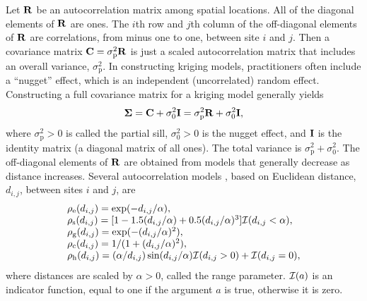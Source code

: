 \documentclass[11pt, titlepage]{article}\usepackage[]{graphicx}\usepackage[]{color}
\begin{document}
\begin{spacing}{1.9}
\begin{flushleft}
Let $\mathbf{R}$ be an autocorrelation matrix among spatial locations.  All of the diagonal elements of $\mathbf{R}$ are ones. The $i$th row and $j$th column of the off-diagonal elements of $\mathbf{R}$ are correlations, from minus one to one, between site $i$ and $j$.  Then a covariance matrix $\mathbf{C} = \sigma^2_\textrm{p}\mathbf{R}$ is just a scaled autocorrelation matrix that includes an overall variance, $\sigma^2_\textrm{p}$.  In constructing kriging models, practitioners often include a ``nugget'' effect, which is an independent (uncorrelated) random effect.  Constructing a full covariance matrix for a kriging model generally yields
\begin{equation} \label{eq:bSigma}
	\mbox{\boldmath $\Sigma$} = \mathbf{C} + \sigma^2_0\mathbf{I} = \sigma^2_\textrm{p}\mathbf{R} + \sigma^2_0\mathbf{I},
\end{equation}
where $\sigma^2_\textrm{p} > 0$ is called the partial sill, $\sigma^2_0 > 0$ is the nugget effect, and $\mathbf{I}$ is the identity matrix (a diagonal matrix of all ones). The total variance is $\sigma^2_\textrm{p} + \sigma^2_0$.  The off-diagonal elements of $\mathbf{R}$ are obtained from models that generally decrease as distance increases. Several autocorrelation models \citep[][p. 80--93]{Chil:Delf:geos:1999}, based on Euclidean distance, $d_{i,j}$, between sites $i$ and $j$, are
\begin{equation} \label{eq:autocorrModels}
	\begin{array}{l}
  \rho_{\textrm{e}}(d_{i,j}) = \exp(-d_{i,j}/\alpha), \\
  \rho_{\textrm{s}}(d_{i,j}) = [1 - 1.5(d_{i,j}/\alpha) + 0.5(d_{i,j}/\alpha)^3] \mathcal{I}(d_{i,j} < \alpha), \\
  \rho_{\textrm{g}}(d_{i,j}) = \exp(-(d_{i,j}/\alpha)^2), \\
	\rho_{\textrm{c}}(d_{i,j}) = 1/(1+(d_{i,j}/\alpha)^2), \\
	\rho_{\textrm{h}}(d_{i,j}) = (\alpha/d_{i,j})\sin(d_{i,j}/\alpha)\mathcal{I}(d_{i,j} > 0) + \mathcal{I}(d_{i,j} = 0),
	\end{array}
\end{equation}
where distances are scaled by $\alpha > 0$, called the range parameter. $\mathcal{I}(a)$ is an indicator function, equal to one if the argument $a$ is true, otherwise it is zero.


\end{flushleft}
\end{spacing}
\end{document}
